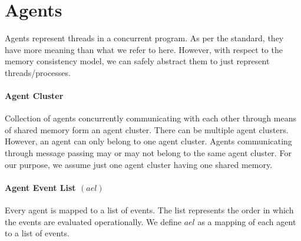 \section{Agents}

    Agents represent threads in a concurrent program. As per the standard, they have more meaning\cite{ECMA} than what we refer to here. 
    However, with respect to the memory consistency model, we can safely abstract them to just represent threads/processes.

    \paragraph{Agent Cluster}
        Collection of agents concurrently communicating with each other through means of shared memory form an agent cluster.  
        There can be multiple agent clusters. 
        However, an agent can only belong to one agent cluster. 
        Agents communicating through message passing may or may not belong to the same agent cluster. 
        For our purpose, we assume just one agent cluster having one shared memory. 

    \paragraph{Agent Event List $(ael)$}
        Every agent is mapped to a list of events. The list represents the order in which the events are evaluated operationally\footnotemark. 
        We define $ael$ as a mapping of each agent to a list of events.
        

        

            

